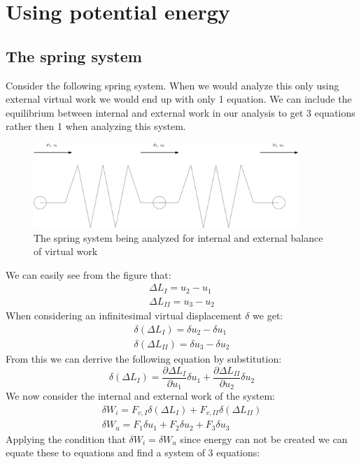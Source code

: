 \documentclass[11pt, a4paper]{article}
\numberwithin{equation}{section}
\numberwithin{figure}{section}
\begin{document}
\setcounter{section}{5}
\section{Using potential energy}
\subsection{The spring system}
Consider the following spring system. When we would analyze this only using external virtual work we would end up with only 1 equation. We can include the equilibrium between internal and external work in our analysis to get 3 equations rather then 1 when analyzing this system. 
\begin{figure}[H]
  \centerline{\includegraphics[width=100mm]{images/Springs.png}}
  \caption{The spring system being analyzed for internal and external balance of virtual work}
\end{figure}
We can easily see from the figure that:
\begin{gather}
  \Delta L_I = u_2 - u_1\\
  \Delta L_{II} = u_3 - u_2
\end{gather}
When considering an infinitesimal virtual displacement $\delta$ we get:
\begin{gather}
  \delta (\Delta L_I) = \delta u_2 - \delta u_1\\
  \delta (\Delta L_{II}) = \delta u_3 - \delta u_2
\end{gather}
From this we can derrive the following equation by substitution:
\begin{equation}
  \delta (\Delta L_I) = \frac{\partial \Delta L_I}{\partial u_1} \delta u_1 + \frac{\partial \Delta L_{II}}{\partial u_2} \delta u_2  
\end{equation}
We now consider the internal and external work of the system:
\begin{gather}
  \delta W_i = F_{v,I} \delta(\Delta L_I) + F_{v, II} \delta(\Delta L_{II})\\
  \delta W_u = F_1\delta u_1 + F_2\delta u_2 + F_3\delta u_3
\end{gather}
Applying the condition that $\delta W_i = \delta W_u$ since energy can not be created we can equate these to equations and find a system of 3 equations:
\end{document}
